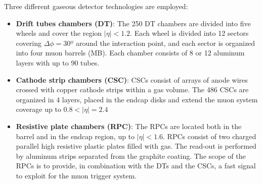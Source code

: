 Three different gaseous detector technologies are employed:
\begin{itemize}
    \item \textbf{Drift tubes chambers (DT)}: The 250 DT chambers are divided into five wheels and cover the region $|\eta|<1.2$. Each wheel is divided into 12 sectors covering $\Delta \phi=30º$ around the interaction point, and each sector is organized into four muon barrels (MB).
    Each chamber consists of 8 or 12 aluminum layers with up to 90 tubes.

    \item \textbf{Cathode strip chambers (CSC)}: CSCs consist of arrays of anode wires crossed with copper cathode strips within a gas volume. The 486 CSCs are organized in 4 layers, placed in the endcap disks and extend the muon system coverage up to $0.8<|\eta|=2.4$

    
    \item \textbf{Resistive plate chambers (RPC)}: The RPCs are located both in the barrel and in the endcap region, up to $|\eta|<1.6$. RPCs consist of two charged parallel high resistive plastic plates filled with gas. The read-out is performed by aluminum strips separated from the graphite coating. The scope of the RPCs is to provide, in combination with the DTs and the CSCs, a fast signal to exploit for the muon trigger system.
\end{itemize}

